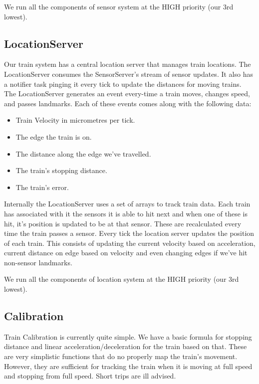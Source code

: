 \documentclass{article}
\begin{document}
We run all the components of sensor system at the HIGH priority (our 3rd lowest).

\subsection{LocationServer}

Our train system has a central location server that manages train locations. The LocationServer consumes the SensorServer's stream of sensor updates. It also has a notifier task pinging it every tick to update the distances for moving trains. The LocationServer generates an event every-time a train moves, changes speed, and passes landmarks. Each of these events comes along with the following data:

\begin{itemize}
    \item Train Velocity in micrometres per tick.
    \item The edge the train is on.
    \item The distance along the edge we've travelled.
    \item The train's stopping distance.
    \item The train's error.
\end{itemize}

Internally the LocationServer uses a set of arrays to track train data. Each train has associated with it the sensors it is able to hit next and when one of these is hit, it's position is updated to be at that sensor. These are recalculated every time the train passes a sensor. Every tick the location server updates the position of each train. This consists of updating the current velocity based on acceleration, current distance on edge based on velocity and even changing edges if we've hit non-sensor landmarks.

We run all the components of location system at the HIGH priority (our 3rd lowest).

\subsection{Calibration}

Train Calibration is currently quite simple. We have a basic formula for stopping distance and linear acceleration/deceleration for the train based on that. These are very simplistic functions that do no properly map the train's movement. However, they are sufficient for tracking the train when it is moving at full speed and stopping from full speed. Short trips are ill advised.
\end{document}
